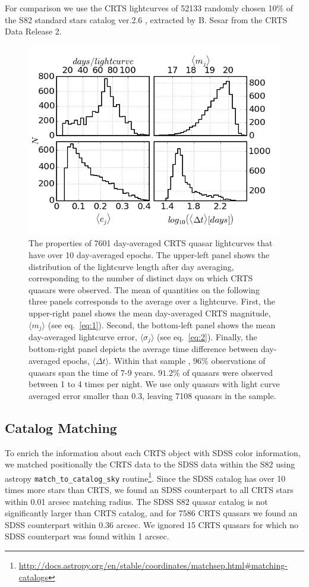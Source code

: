 \documentclass[fleqn,usenatbib]{mnras}  %
\begin{document}
For comparison we use the CRTS lightcurves of 52133 randomly chosen  10\% of the S82 standard stars catalog ver.2.6 \citep{ivezic2007}, extracted by B. Sesar from the CRTS Data Release 2.

\begin{figure}
\label{fig:1}
 \includegraphics[width=\columnwidth]{Fig_1_QSO_CRTS_proc_stats.png}
 \caption{The properties of 7601 day-averaged CRTS quasar lightcurves that have over 10 day-averaged epochs. The upper-left panel shows the distribution of the lightcurve length after day averaging, corresponding to the number of distinct days on which CRTS quasars were observed. The mean of quantities on the following three panels corresponds to the average over a lightcurve. First, the upper-right panel shows the mean day-averaged CRTS magnitude, $\langle  m_{j} \rangle$ (see eq.~\ref{eq:1}). Second, the bottom-left panel shows the  mean day-averaged lightcurve error, $\langle \sigma_{j} \rangle$ (see eq.~\ref{eq:2}). Finally, the bottom-right panel depicts the average time  difference between day-averaged epochs,  $\langle \Delta t \rangle$. Within that sample , $96 \% $ observations of quasars span the time of 7-9 years.  $91.2\%$ of  quasars were observed between 1 to 4 times per night. We use only quasars with light curve averaged error smaller than 0.3, leaving 7108 quasars in the sample.}
\end{figure}



\subsection{Catalog Matching}
To enrich the information about each CRTS object with SDSS color information, we matched positionally the CRTS data to the SDSS data within the S82 using astropy \citep{robitaille2013} \verb|match_to_catalog_sky|  routine\footnote{\url{http://docs.astropy.org/en/stable/coordinates/matchsep.html\#matching-catalogs}}.  
Since the SDSS catalog has over 10 times more stars than CRTS, we found an SDSS counterpart to all  CRTS stars within 0.01 arcsec matching radius. The SDSS S82 quasar catalog is not significantly larger than CRTS catalog, and for 7586 CRTS quasars we found an SDSS counterpart within 0.36 arcsec.   We  ignored  15 CRTS quasars for which no SDSS counterpart was found within 1 arcsec.  
\end{document}
